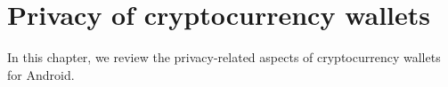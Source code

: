 \chapter{Privacy of cryptocurrency wallets}

\label{Chapter04_Wallets}

In this chapter, we review the privacy-related aspects of cryptocurrency wallets for Android.